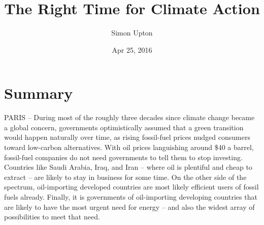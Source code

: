 \documentclass{article}
\title{The Right Time for Climate Action}
\author{Simon Upton}
\date{Apr 25, 2016}
\begin{document}
\maketitle
\section{Summary}
PARIS – During most of the roughly three decades since climate change became a global concern, governments optimistically assumed that a green transition would happen naturally over time, as rising fossil{-}fuel prices nudged consumers toward low{-}carbon alternatives. With oil prices languishing around \$40 a barrel, fossil{-}fuel companies do not need governments to tell them to stop investing. Countries like Saudi Arabia, Iraq, and Iran – where oil is plentiful and cheap to extract – are likely to stay in business for some time. On the other side of the spectrum, oil{-}importing developed countries are most likely efficient users of fossil fuels already. Finally, it is governments of oil{-}importing developing countries that are likely to have the most urgent need for energy – and also the widest array of possibilities to meet that need.
\end{document}
